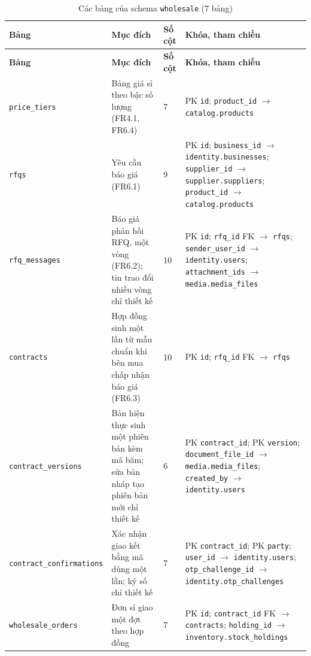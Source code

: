\begingroup
\tblsetup\footnotesize\renewcommand{\arraystretch}{1.1}
\begin{longtable}{L{3.20cm} L{5.60cm} L{1.10cm} L{5.00cm}}
\caption{Các bảng của schema \texttt{wholesale} (7 bảng)}
\label{tab:db-wholesale} \\
\toprule
{}
\textbf{Bảng} & \textbf{Mục đích} & \textbf{Số cột} & \textbf{Khóa, tham chiếu} \\
\midrule
\endfirsthead
\toprule
{}
\textbf{Bảng} & \textbf{Mục đích} & \textbf{Số cột} & \textbf{Khóa, tham chiếu} \\
\midrule
\endhead
\bottomrule
\endfoot
\texttt{price\_\allowbreak{}tiers} & Bảng giá sỉ theo bậc số lượng (FR4.1, FR6.4) & 7 & PK \texttt{id}; \texttt{product\_\allowbreak{}id} $\to$ \texttt{catalog.products} \\
\texttt{rfqs} & Yêu cầu báo giá (FR6.1) & 9 & PK \texttt{id}; \texttt{business\_\allowbreak{}id} $\to$ \texttt{identity.businesses}; \texttt{supplier\_\allowbreak{}id} $\to$ \texttt{supplier.suppliers}; \texttt{product\_\allowbreak{}id} $\to$ \texttt{catalog.products} \\
\texttt{rfq\_\allowbreak{}messages} & Báo giá phản hồi RFQ, một vòng (FR6.2); tin trao đổi nhiều vòng chỉ thiết kế & 10 & PK \texttt{id}; \texttt{rfq\_\allowbreak{}id} FK $\to$ \texttt{rfqs}; \texttt{sender\_\allowbreak{}user\_\allowbreak{}id} $\to$ \texttt{identity.users}; \texttt{attachment\_\allowbreak{}ids} $\to$ \texttt{media.media\_\allowbreak{}files} \\
\texttt{contracts} & Hợp đồng sinh một lần từ mẫu chuẩn khi bên mua chấp nhận báo giá (FR6.3) & 10 & PK \texttt{id}; \texttt{rfq\_\allowbreak{}id} FK $\to$ \texttt{rfqs} \\
\texttt{contract\_\allowbreak{}versions} & Bản hiện thực sinh một phiên bản kèm mã băm; sửa bản nháp tạo phiên bản mới chỉ thiết kế & 6 & PK \texttt{contract\_\allowbreak{}id}; PK \texttt{version}; \texttt{document\_\allowbreak{}file\_\allowbreak{}id} $\to$ \texttt{media.media\_\allowbreak{}files}; \texttt{created\_\allowbreak{}by} $\to$ \texttt{identity.users} \\
\texttt{contract\_\allowbreak{}confirmations} & Xác nhận giao kết bằng mã dùng một lần; ký số chỉ thiết kế & 7 & PK \texttt{contract\_\allowbreak{}id}; PK \texttt{party}; \texttt{user\_\allowbreak{}id} $\to$ \texttt{identity.users}; \texttt{otp\_\allowbreak{}challenge\_\allowbreak{}id} $\to$ \texttt{identity.otp\_\allowbreak{}challenges} \\
\texttt{wholesale\_\allowbreak{}orders} & Đơn sỉ giao một đợt theo hợp đồng & 7 & PK \texttt{id}; \texttt{contract\_\allowbreak{}id} FK $\to$ \texttt{contracts}; \texttt{holding\_\allowbreak{}id} $\to$ \texttt{inventory.stock\_\allowbreak{}holdings} \\
\end{longtable}
\endgroup

